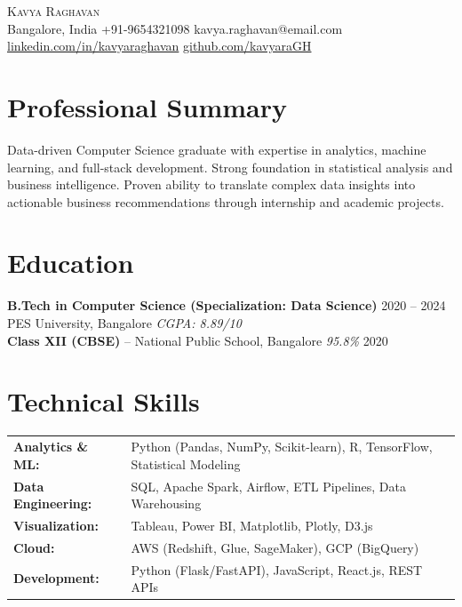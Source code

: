 \documentclass[11pt,a4paper]{article}
\begin{document}
\begin{center}
{\fontsize{22}{26}\selectfont\scshape Kavya Raghavan}\\[6pt]
{\small Bangalore, India \quad\textbar\quad +91-9654321098 \quad\textbar\quad kavya.raghavan@email.com}\\[2pt]
{\small \href{https://linkedin.com/in/kavyaraghavan}{linkedin.com/in/kavyaraghavan} \quad\textbar\quad \href{https://github.com/kavyaraGH}{github.com/kavyaraGH}}
\end{center}

\section{Professional Summary}
Data-driven Computer Science graduate with expertise in analytics, machine learning, and full-stack development. Strong foundation in statistical analysis and business intelligence. Proven ability to translate complex data insights into actionable business recommendations through internship and academic projects.

\section{Education}
\textbf{B.Tech in Computer Science (Specialization: Data Science)} \hfill 2020 -- 2024\\
PES University, Bangalore \hfill \textit{CGPA: 8.89/10}\\[4pt]
\textbf{Class XII (CBSE)} -- National Public School, Bangalore \hfill \textit{95.8\%} \hfill 2020

\section{Technical Skills}
\begin{tabularx}{\textwidth}{@{}l X@{}}
\textbf{Analytics \& ML:} & Python (Pandas, NumPy, Scikit-learn), R, TensorFlow, Statistical Modeling\\
\textbf{Data Engineering:} & SQL, Apache Spark, Airflow, ETL Pipelines, Data Warehousing\\
\textbf{Visualization:} & Tableau, Power BI, Matplotlib, Plotly, D3.js\\
\textbf{Cloud:} & AWS (Redshift, Glue, SageMaker), GCP (BigQuery)\\
\textbf{Development:} & Python (Flask/FastAPI), JavaScript, React.js, REST APIs\\
\end{tabularx}
\end{document}
